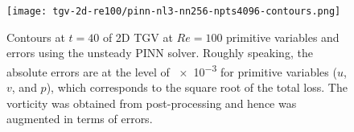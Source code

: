 \begin{figure}[t]
    \centering%
    \texttt{[image: tgv-2d-re100/pinn-nl3-nn256-npts4096-contours.png]}
    \caption{%
        Contours at $t=40$ of 2D TGV at $Re=\num{100}$ primitive variables and errors using the unsteady PINN solver.
        Roughly speaking, the absolute errors are at the level of \num{e-3} for primitive variables ($u$, $v$, and $p$), which corresponds to the square root of the total loss.
        The vorticity was obtained from post-processing and hence was augmented in terms of errors.
    }
    \label{fig:tgv-pinn-contours}%
\end{figure}

